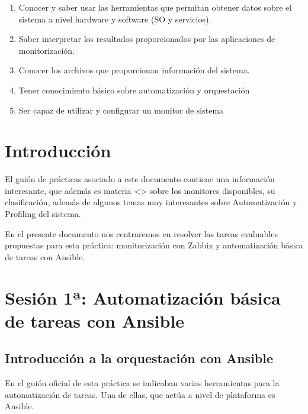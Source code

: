\documentclass[
]{memoir}
\providecommand{\tightlist}{%
  \setlength{\itemsep}{0pt}\setlength{\parskip}{0pt}}
\begin{document}
\begin{enumerate}
\def\labelenumi{\arabic{enumi}.}
\tightlist
\item
  Conocer y saber usar las herramientas que permitan obtener datos sobre el sistema a nivel hardware y software (SO y servicios).
\item
  Saber interpretar los resultados proporcionados por las aplicaciones de monitorización.
\item
  Conocer los archivos que proporcionan información del sistema.
\item
  Tener conocimiento básico sobre automatización y orquestación
\item
  Ser capaz de utilizar y configurar un monitor de sistema
\end{enumerate}

\hypertarget{introducciuxf3n}{%
\section{Introducción}\label{introducciuxf3n}}

El guión de prácticas asociado a este documento contiene una información interesante, que además es materia \textless{}\textgreater{} sobre los monitores disponibles, su clasificación, además de algunos temas muy interesantes sobre Automatización y Profiling del sistema.

En el presente documento nos centraremos en resolver las tareas evaluables propuestas para esta práctica: monitorización con Zabbix y automatización básica de tareas con Ansible.

\hypertarget{sesiuxf3n-1uxaa-automatizaciuxf3n-buxe1sica-de-tareas-con-ansible}{%
\section{Sesión 1ª: Automatización básica de tareas con Ansible}\label{sesiuxf3n-1uxaa-automatizaciuxf3n-buxe1sica-de-tareas-con-ansible}}

\hypertarget{introducciuxf3n-a-la-orquestaciuxf3n-con-ansible}{%
\subsection{Introducción a la orquestación con Ansible}\label{introducciuxf3n-a-la-orquestaciuxf3n-con-ansible}}

En el guión oficial de esta práctica se indicaban varias herramientas para la automatización de tareas. Una de ellas, que actúa a nivel de plataforma es Ansible.
\end{document}
